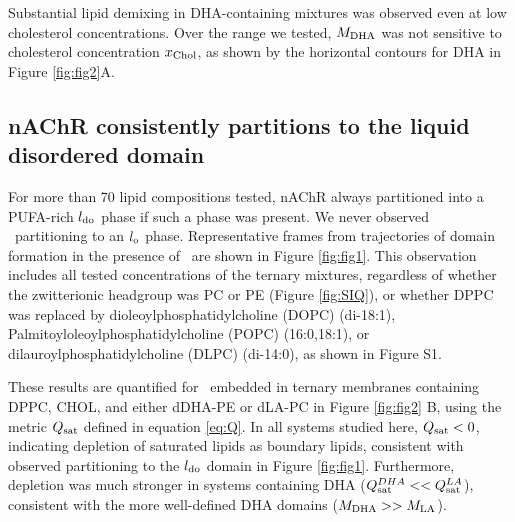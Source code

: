 	Substantial lipid demixing in DHA-containing mixtures was observed even at low cholesterol concentrations. Over the range we tested, $M_{\mathrm{DHA}}$ was not sensitive to cholesterol concentration $x_{\mathrm{Chol}}$, as shown by the horizontal contours for DHA in Figure \ref{fig:fig2}A.   

\subsection{nAChR consistently partitions to the liquid disordered domain} \label{PUFA}
	For more than 70 lipid compositions tested, nAChR always partitioned into a PUFA-rich $l_{\mathrm{do}}$ phase if such a phase was present. We never observed \nachr~partitioning to an $l_{\mathrm{o}}$ phase. Representative frames from trajectories of domain formation in the presence of \nachr~are shown in Figure \ref{fig:fig1}.  This observation includes all tested concentrations of the ternary mixtures, regardless of whether the zwitterionic headgroup was PC or PE (Figure \ref{fig:SIQ}), or whether DPPC was replaced by dioleoylphosphatidylcholine (DOPC) (di-18:1), Palmitoyloleoylphosphatidylcholine (POPC) (16:0,18:1), or dilauroylphosphatidylcholine (DLPC) (di-14:0), as shown in Figure S1.   
	
	{These results are quantified for \nachr~embedded in ternary membranes containing DPPC, CHOL, and either dDHA-PE or dLA-PC in Figure \ref{fig:fig2} B, using the metric $Q_{\mathrm{sat}}$ defined in equation \ref{eq:Q}.}  
	In all systems studied here, $Q_{\mathrm{sat}} < 0$, indicating depletion of saturated lipids as boundary lipids, consistent with observed partitioning to the $l_{\mathrm{do}}$ domain in Figure \ref{fig:fig1}. Furthermore, depletion was much stronger in systems containing DHA ($Q_{\mathrm{sat}}^{DHA}<< Q_{\mathrm{sat}}^{LA}$), consistent with the more well-defined DHA domains ($M_{\mathrm{DHA}}>> M_{\mathrm{LA}}$). 

